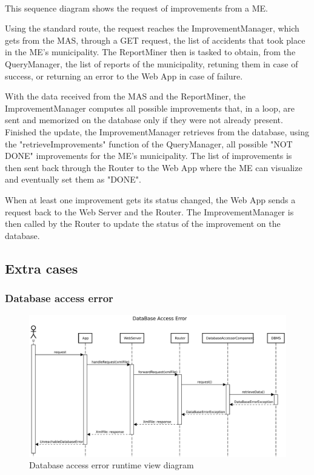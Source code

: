 					\paragraph{}
						This sequence diagram shows the request of improvements from a ME. 
						
						Using the standard route, the request reaches the ImprovementManager, which gets from the MAS, through a GET request, the list of accidents that took place in the ME's municipality. The ReportMiner then is tasked to obtain, from the QueryManager, the list of reports of the municipality, retuning them in case of success, or returning an error to the Web App in case of failure. 
						
						With the data received from the MAS and the ReportMiner, the ImprovementManager computes all possible improvements that, in a loop, are sent and memorized on the database only if they were not already present. Finished the update, the ImprovementManager retrieves from the database, using the "retrieveImprovements" function of the QueryManager, all possible "NOT DONE" improvements for the ME's municipality. The list of improvements is then sent back through the Router to the Web App where the ME can visualize and eventually set them as "DONE". 
						
						When at least one improvement gets its status changed, the Web App sends a request back to the Web Server and the Router. The ImprovementManager is then called by the Router to update the status of the improvement on the database.
			\subsection{Extra cases}
				\subsubsection{Database access error}
					\begin{figure}[!h]
						\centering
						\includegraphics[width=\textwidth]{images/DD2/RuntimeView/Error/dbAccessError.pdf}
						\caption{Database access error runtime view diagram}
					\end{figure}
